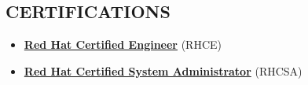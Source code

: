 \documentclass[13pt,letterpaper]{article}
\newcommand{\slist}[1]
{
\vspace{-1.8em}
\subsection*{\color{dgray} #1}
\vspace{-0.4em}
}
\newcommand{\linktitle}[2]
{ \textbf{\href{#1}{\color{NavyBlue}#2}}}
\begin{document}
\slist{CERTIFICATIONS}

\begin{itemize}
    \parskip=-0.1em
	\item{\linktitle{https://www.redhat.com/wapps/training/certification/verify.html?certNumber=140-025-057\&isSearch=False\&verify=Verify}{Red Hat Certified Engineer} (RHCE)}
	\item{\linktitle{https://www.redhat.com/wapps/training/certification/verify.html?certNumber=140-025-057\&isSearch=False\&verify=Verify}{Red Hat Certified System Administrator} (RHCSA)}

\end{itemize}
\end{document}
